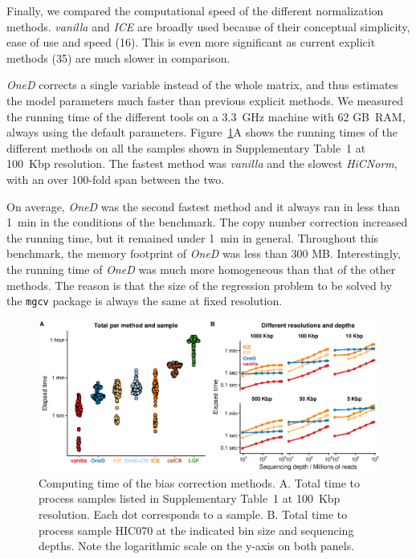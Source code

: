 \documentclass[a4,center,fleqn]{NAR}
\providecommand{\DIFadd}[1]{{\protect\color{red}#1}} %
\providecommand{\DIFdel}[1]{{\protect}}                      %
\providecommand{\DIFaddbegin}{} %
\providecommand{\DIFaddend}{} %
\providecommand{\DIFdelbegin}{} %
\providecommand{\DIFdelend}{} %
\begin{document}
Finally, we compared the computational speed of the different
normalization methods. \textit{vanilla} and \textit{ICE} are broadly used
because of their conceptual simplicity, ease of use and speed
(16). This is even more significant as current
explicit methods (\DIFdelbegin \DIFdel{32}\DIFdelend \DIFaddbegin \DIFadd{35}\DIFaddend ) are much slower in comparison.

\textit{OneD} corrects a single variable instead of the whole matrix, and
thus estimates the model parameters much faster than previous explicit
methods. We measured the running time of the different tools on a 3.3~GHz
machine with 62 GB~RAM, always using the default parameters.
Figure~\ref{fig:times}A shows the running times of the different methods
on all the samples shown in Supplementary \DIFdelbegin \DIFdel{Figure}\DIFdelend \DIFaddbegin \DIFadd{Table}\DIFaddend ~1 at 100~Kbp resolution.
The fastest method was \textit{vanilla} and the slowest \textit{\DIFdelbegin \DIFdel{LGF}\DIFdelend \DIFaddbegin \DIFadd{HiCNorm}\DIFaddend }, with
an over 100-fold span between the two.

On average, \textit{OneD} was the second fastest method and it always ran in less than
1~min in the conditions of the benchmark. The copy number correction
increased the running time, but it remained under 1~min in general.
Throughout this benchmark, the memory footprint of \textit{OneD} was less
than 300 MB.  Interestingly, the running time of \textit{OneD} was much
more homogeneous than that of the other methods. The reason is that the
size of the regression problem to be solved by the \texttt{mgcv} package
is always the same at fixed resolution.

\begin{figure}
\centerline{\includegraphics[width=.49\textwidth]{figure_6.eps}}
\caption{Computing time of the bias correction methods. A. Total time to
process samples listed in Supplementary Table~1 at 100~Kbp resolution.
Each dot corresponds to a sample. B. Total time to process sample HIC070
at the indicated bin size and sequencing depths. Note the logarithmic
scale on the y-axis on both panels.}
\label{fig:times}
\end{figure}
\end{document}
